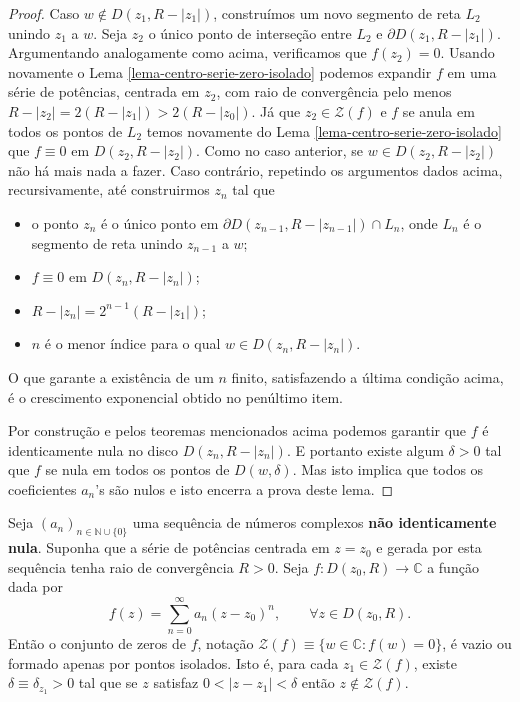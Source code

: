 \begin{proof}
Caso $w\notin D(z_1,R-|z_1|)$, construímos um novo segmento de reta $L_2$
unindo $z_1$ a $w$. Seja $z_2$ o único ponto de interseção entre $L_2$
e $\partial D(z_1,R-|z_1|)$. Argumentando analogamente como acima, verificamos
que $f(z_2)=0$. Usando novamente o Lema \ref{lema-centro-serie-zero-isolado} 
podemos expandir $f$ em uma série de potências, centrada em $z_2$, 
com raio de convergência pelo menos $R-|z_2| = 2(R-|z_1|)>2(R-|z_0|)$.
Já que $z_2\in\mathcal{Z}(f)$ e $f$ se anula em todos os pontos de $L_2$
temos novamente do Lema \ref{lema-centro-serie-zero-isolado} que 
$f\equiv 0$ em $D(z_2,R-|z_2|)$. Como no caso anterior,
se $w\in D(z_2,R-|z_2|)$ não há mais nada a fazer. Caso contrário, 
repetindo os argumentos dados acima, recursivamente, 
até construirmos $z_n$ tal que 
\begin{itemize}
\item
o ponto $z_n$ é o único ponto em $\partial D(z_{n-1},R-|z_{n-1}|)\cap L_n$,
onde $L_n$ é o segmento de reta unindo $z_{n-1}$ a $w$;

\item $f\equiv 0$ em  $D(z_{n},R-|z_{n}|)$;

\item $R-|z_n|= 2^{n-1}(R-|z_1|)$;

\item  $n$ é o menor índice para o qual $w\in D(z_{n},R-|z_{n}|)$.
\end{itemize} 

O que garante a existência de um $n$ finito, satisfazendo a última condição
acima, é o crescimento exponencial obtido no penúltimo item. 

Por construção e pelos teoremas mencionados acima podemos garantir que 
$f$ é identicamente nula no disco $D(z_{n},R-|z_{n}|)$. E portanto
existe algum $\delta>0$ tal que $f$ se nula em todos
os pontos de $D(w,\delta)$. Mas isto implica que todos 
os coeficientes $a_n$'s são nulos e isto encerra a prova deste lema.
\end{proof}



\begin{teorema}
\label{teo-zeros-series-isolados}
Seja $(a_n)_{n\in\mathbb{N}\cup\{0\}}$ uma sequência de números complexos
\textbf{não identicamente nula}. Suponha que a série de potências 
centrada em $z=z_0$ e gerada por esta sequência tenha raio de convergência $R>0$. 
Seja $f:D(z_0,R)\to\mathbb{C}$ a função dada por
\[
f(z) = \sum_{n=0}^{\infty}a_n(z-z_0)^n, \qquad \forall z\in D(z_0,R).
\]
Então o conjunto de zeros de $f$, notação 
$\mathcal{Z}(f)\equiv \{w\in\mathbb{C}: f(w)=0\}$,
é vazio ou formado apenas por pontos isolados. Isto é, 
para cada $z_1\in \mathcal{Z}(f)$, existe $\delta\equiv\delta_{z_1}>0$ tal que 
se $z$ satisfaz $0<|z-z_1|<\delta$ então $z\notin \mathcal{Z}(f)$.
\end{teorema}


